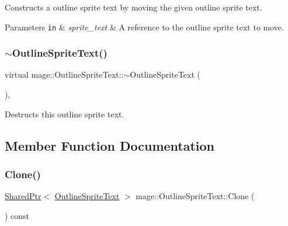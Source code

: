 Constructs a outline sprite text by moving the given outline sprite text.


\begin{DoxyParams}[1]{Parameters}
\mbox{\tt in}  & {\em sprite\+\_\+text} & A reference to the outline sprite text to move. \\
\hline
\end{DoxyParams}
\hypertarget{classmage_1_1_outline_sprite_text_a13ab47f5f6ade5dc5076ebb127a24261}{}\label{classmage_1_1_outline_sprite_text_a13ab47f5f6ade5dc5076ebb127a24261} 
\subsubsection{\texorpdfstring{$\sim$\+Outline\+Sprite\+Text()}{~OutlineSpriteText()}}
{\footnotesize\ttfamily virtual mage\+::\+Outline\+Sprite\+Text\+::$\sim$\+Outline\+Sprite\+Text (\begin{DoxyParamCaption}{ }\end{DoxyParamCaption})\hspace{0.3cm}{\ttfamily [virtual]}, {\ttfamily [default]}}

Destructs this outline sprite text. 

\subsection{Member Function Documentation}
\hypertarget{classmage_1_1_outline_sprite_text_ad3184b798d08e38d10f910a6e9dc1495}{}\label{classmage_1_1_outline_sprite_text_ad3184b798d08e38d10f910a6e9dc1495} 
\subsubsection{\texorpdfstring{Clone()}{Clone()}}
{\footnotesize\ttfamily \hyperlink{namespacemage_a1e01ae66713838a7a67d30e44c67703e}{Shared\+Ptr}$<$ \hyperlink{classmage_1_1_outline_sprite_text}{Outline\+Sprite\+Text} $>$ mage\+::\+Outline\+Sprite\+Text\+::\+Clone (\begin{DoxyParamCaption}{ }\end{DoxyParamCaption}) const}

